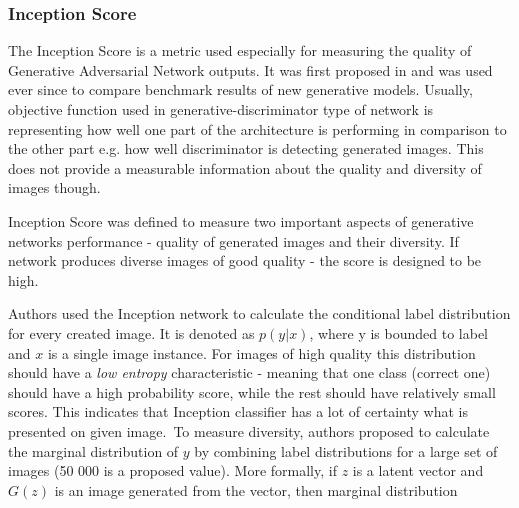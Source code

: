 \documentclass[12pt,a4paper,openany]{book}
\begin{document}



\subsubsection*{Inception Score}



The Inception Score is a metric used especially for measuring the quality of Generative Adversarial Network outputs. It was first proposed in \cite{improvedgans} and was used ever since to compare benchmark results of new generative models. Usually, objective function used in generative-discriminator type of network is representing how well one part of the architecture is performing in comparison to the other part e.g. how well discriminator is detecting generated images. This does not provide a measurable information about the quality and diversity of images though.\

Inception Score was defined to measure two important aspects of generative networks performance - quality of generated images and their diversity. If network produces diverse images of good quality - the score is designed to be high.\

Authors used the Inception network \cite{inception} to calculate the conditional label distribution for every created image. It is denoted as $p(y|x)$, where y is bounded to label and $x$ is a single image instance. For images of high quality this distribution should have a \textit{low entropy} characteristic - meaning that one class (correct one) should have a high probability score, while the rest should have relatively small scores. This indicates that Inception classifier has a lot of certainty what is presented on given image.\ 
To measure diversity, authors proposed to calculate the marginal distribution of $y$ by combining label distributions for a large set of images (50 000 is a proposed value). More formally, if $z$ is a latent vector and $G(z)$ is an image generated from the vector, then marginal distribution 
\end{document}
